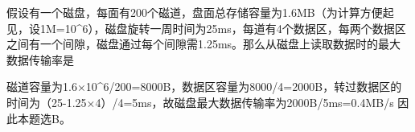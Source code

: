 \question 假设有一个磁盘，每面有200个磁道，盘面总存储容量为1.6MB（为计算方便起见，设1M=10\^{}6），磁盘旋转一周时间为25ms，每道有4个数据区，每两个数据区之间有一个间隙，磁盘通过每个间隙需1.25ms。那么从磁盘上读取数据时的最大数据传输率是
\par{}
\begin{solution}磁道容量为1.6×10\^{}6/200=8000B，数据区容量为8000/4=2000B，转过数据区的时间为（25-1.25×4）/4=5ms，故磁盘最大数据传输率为2000B/5ms=0.4MB/s
因此本题选B。
\end{solution}
